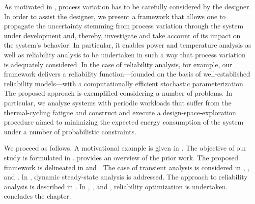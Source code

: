As motivated in , process variation has to be carefully
considered by the designer. In order to assist the designer, we present a
framework that allows one to propagate the uncertainty stemming from process
variation through the system under development and, thereby, investigate and
take account of its impact on the system's behavior. In particular, it enables
power and temperature analysis as well as reliability analysis to be undertaken
in such a way that process variation is adequately considered. In the case of
reliability analysis, for example, our framework delivers a reliability
function---founded on the basis of well-established reliability models---with a
computationally efficient stochastic parameterization. The proposed approach is
exemplified considering a number of problems. In particular, we analyze systems
with periodic workloads that suffer from the thermal-cycling fatigue and
construct and execute a design-space-exploration procedure aimed to minimizing
the expected energy consumption of the system under a number of probabilistic
constraints.

We proceed as follows. A motivational example is given in
. The objective of our study is formulated in
.  provides an overview of the prior work.
The proposed framework is delineated in  and
. The case of transient analysis is considered
in , , and
. In ,
dynamic steady-state analysis is addressed. The approach to reliability analysis
is described in . In
, , and
, reliability optimization is undertaken.
 concludes the chapter.
